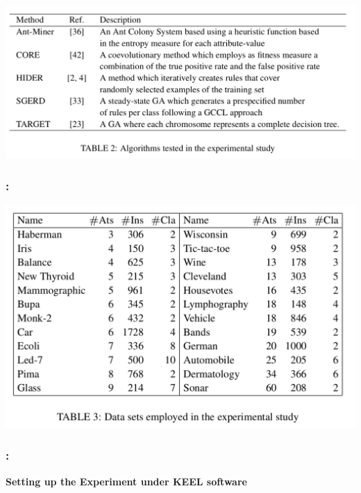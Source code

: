 \documentclass{beamer}
\begin{document}
\begin{CJK*}{UTF8}{bsmi}
\begin{frame}
	\begin{center}
		\includegraphics[width=1\linewidth]{./6.png}
	\end{center}
\end{frame}


\begin{frame}
	\frametitle{\insertsection : \insertsubsection}
	
	\begin{center}
		\includegraphics[width=.9\linewidth]{./7.png}
	\end{center}
\end{frame}


\begin{frame}
	\frametitle{\insertsection : \insertsubsection}
	\textbf{Setting up the Experiment under KEEL software}
	

\end{frame}
\end{CJK*}
\end{document}
